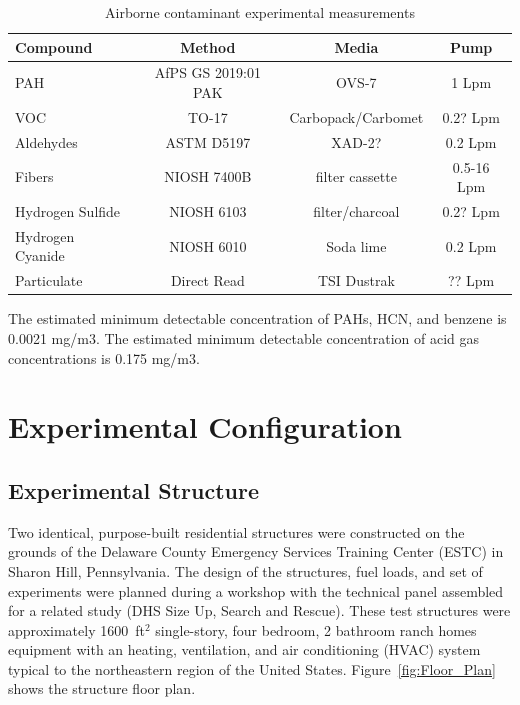 \documentclass[12pt,oneside]{book}
\begin{document}
\begin{table}[!ht]
	\centering
	\caption{Airborne contaminant experimental measurements}
	\begin{tabular}{lccc}
		\toprule[1.5pt]
		Compound & Method & Media & Pump \\
		\midrule
		PAH   				& AfPS GS 2019:01 PAK   & OVS-7     		& 1 Lpm     \\
		VOC    				& TO-17     			& Carbopack/Carbomet& 0.2? Lpm    \\
		Aldehydes   	 	& ASTM D5197		    & XAD-2?   			& 0.2 Lpm    \\
		Fibers    			& NIOSH 7400B      		& filter cassette 	& 0.5-16 Lpm   \\
		Hydrogen Sulfide  	& NIOSH 6103		    & filter/charcoal	& 0.2? Lpm     \\
		Hydrogen Cyanide   	& NIOSH 6010		    & Soda lime			& 0.2 Lpm    \\
		Particulate   		& Direct Read     		& TSI Dustrak 		& ?? Lpm    \\
		\bottomrule[1.25pt]
	\end{tabular}
\end{table}
The estimated minimum detectable concentration of PAHs, HCN, and benzene  is  0.0021 mg/m3.
The estimated minimum detectable concentration of acid gas concentrations is 0.175 mg/m3.


\chapter{Experimental Configuration}
\label{chap:exp_config}

\section{Experimental Structure}

Two identical, purpose-built residential structures were constructed on the grounds of the Delaware County Emergency Services Training Center (ESTC) in Sharon Hill, Pennsylvania. The design of the structures, fuel loads, and set of experiments were planned during a workshop with the technical panel assembled for a related study (DHS Size Up, Search and Rescue).  These test structures were approximately 1600~ft$^2$ single-story, four bedroom, 2 bathroom ranch homes equipment with an heating, ventilation, and air conditioning (HVAC) system typical to the northeastern region of the United States. Figure~\ref{fig:Floor_Plan} shows the structure floor plan.
\end{document}
